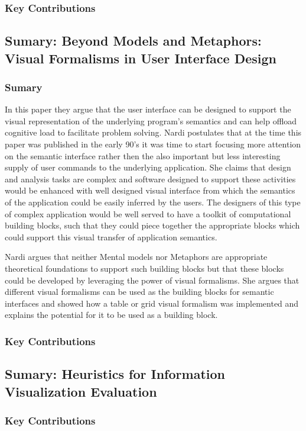 \documentclass{sig-alternate}
\begin{document}
\subsubsection{Key Contributions}
\subsection{Sumary: Beyond Models and Metaphors: Visual Formalisms in User
Interface Design\cite{Nardi:BeyondModels}}
\subsubsection{Sumary}
In this paper they argue that the user interface can be designed to support
the visual representation of the underlying program's semantics and can help
offload cognitive load to facilitate problem solving. Nardi postulates that at
the time this paper was published in the early 90's it was time to start
focusing more attention on the semantic interface rather then the also
important but less interesting supply of user commands to the underlying
application. She claims that design and analysis tasks are complex and software
designed to support these activities would be enhanced with well designed
visual interface from which the semantics of the application could be easily
inferred by the users. The designers of this type of complex application would
be well served to have a toolkit of computational building blocks, such that
they could piece together the appropriate blocks which could support this
visual transfer of application semantics.

Nardi argues that neither Mental models nor Metaphors are appropriate
theoretical foundations to support such  building blocks but that these blocks
could be developed by leveraging the power of visual formalisms. She argues
that different visual formalisms can be used as the building blocks for
semantic interfaces and showed how a table or grid visual formalism was
implemented and explains the potential for it to be used as a building block.
\subsubsection{Key Contributions}
\subsection{Sumary: Heuristics for Information Visualization Evaluation}
\subsubsection{Key Contributions}
\end{document}
